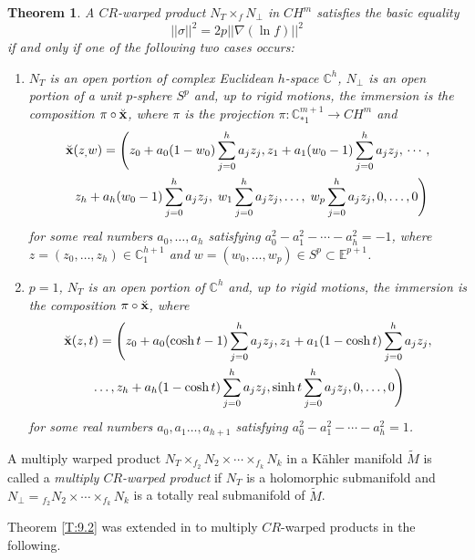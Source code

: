 \documentclass{amsart}
\theoremstyle{plain}
\newtheorem{theorem}{Theorem}[section]
\numberwithin{equation}{section}
\theoremstyle{remark}
\numberwithin{equation}{section}
\begin{document}
\begin{theorem} \label{T:9.5}  A $CR$-warped product $N_T\times_{f} N_\perp$  in $CH^m$ satisfies the basic equality $$||\sigma||^2= 2p||\nabla (\ln f)||^2$$ if and only if one of the following two cases occurs:
\begin{enumerate}
\item $N_T$ is an open portion of complex Euclidean $h$-space ${\mathbb C}^h$, $N_\perp$ is an open portion of  a unit $p$-sphere $S^p$ and, up to rigid motions, the immersion is the composition $\pi\circ\breve{\hbox{\bf x}}$, where $\pi$ is the projection $\pi:{\mathbb C}^{m+1}_{*1}\to CH^m$ and 
\begin{align}\notag &\breve{\hbox{\bf x}}(z_,w)=\Bigg( z_0+a_0(1-w_0)\sum_{j=0}^h a_j z_j,z_1+a_1(w_0-1)\sum_{j=0}^h a_j z_j,\,\cdots, \\&\hskip.1 in  z_h+a_h(w_0-1)\sum_{j=0}^h a_jz_j,\;w_1\sum_{j=0}^h a_jz_j,\ldots,\; w_p\sum_{j=0}^h
a_jz_j,0,\ldots,0\Bigg)\notag \end{align} 
for some real numbers  $a_0,\ldots,a_{h}$  satisfying
$a_0^2-a_1^2-\cdots-a_{h}^2=-1$, where 
$z=(z_0,\ldots,z_h)\in{\mathbb C}^{h+1}_1$ and $
w=(w_0,\ldots,w_p)\in S^p\subset{\mathbb E}^{p+1}$.

\item $p=1$,   $N_T$ is an open portion of  ${\mathbb C}^h$ and, up to rigid motions, the immersion  is  the composition $\pi\circ\breve{\hbox{\bf x}}$, where 
\begin{align} \notag &\breve{\hbox{\bf x}}(z,t)=\Bigg(z_0+a_0(\cosh t-1)\sum_{j=0}^h a_j z_j,  z_1+a_1(1-\cosh t)\sum_{j=0}^h
a_jz_j,\\&\hskip.3in \ldots,z_h+a_h(1-\cosh t)\sum_{j=0}^h a_jz_j, \sinh t\sum_{j=0}^h a_jz_j,0,\ldots,0\Bigg)\notag
\end{align} 
for some real numbers $a_0,a_1\ldots,a_{h+1}$ satisfying $a_0^2-a_1^2-\cdots-a_{h}^2=1$.
\end{enumerate}\end{theorem} 

A multiply warped product $N_T \times_{f_2} N_2\times \cdots \times_{f_k} N_k$ in a K\"ahler manifold $\tilde M$ is called a {\it multiply $CR$-warped product}  if $N_T$ is a holomorphic submanifold and $N_\perp={}_{f_2} N_2 \times \cdots\times_{f_k} N_k$ is a totally real submanifold of $\tilde M$.

Theorem \ref{T:9.2} was extended in \cite{CD08} to multiply $CR$-warped products in the following.
\end{document}

